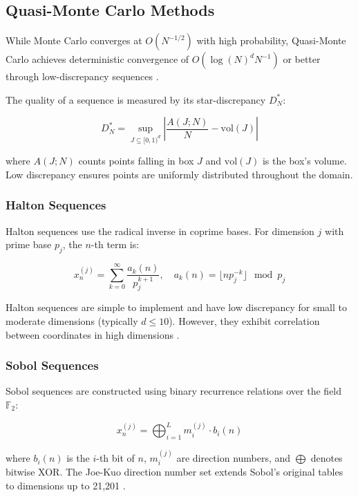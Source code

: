 \documentclass[11pt,a4paper]{article}
\begin{document}
\subsection{Quasi-Monte Carlo Methods}

While Monte Carlo converges at $O(N^{-1/2})$ with high probability, Quasi-Monte Carlo achieves deterministic convergence of $O(\log(N)^d N^{-1})$ or better through low-discrepancy sequences \cite{niederreiter1992random}.

The quality of a sequence is measured by its star-discrepancy $D_N^*$:

\begin{equation}
D_N^* = \sup_{J \subseteq [0,1)^d} \left| \frac{A(J;N)}{N} - \text{vol}(J) \right|
\end{equation}

where $A(J;N)$ counts points falling in box $J$ and $\text{vol}(J)$ is the box's volume. Low discrepancy ensures points are uniformly distributed throughout the domain.

\subsubsection{Halton Sequences}

Halton sequences use the radical inverse in coprime bases. For dimension $j$ with prime base $p_j$, the $n$-th term is:

\begin{equation}
x_n^{(j)} = \sum_{k=0}^{\infty} \frac{a_k(n)}{p_j^{k+1}}, \quad a_k(n) = \lfloor n p_j^{-k} \rfloor \mod p_j
\end{equation}

Halton sequences are simple to implement and have low discrepancy for small to moderate dimensions (typically $d \le 10$). However, they exhibit correlation between coordinates in high dimensions \cite{warnock1972quantum}.

\subsubsection{Sobol Sequences}

Sobol sequences are constructed using binary recurrence relations over the field $\mathbb{F}_2$:

\begin{equation}
x_n^{(j)} = \bigoplus_{i=1}^{L} m_{i}^{(j)} \cdot b_i(n)
\end{equation}

where $b_i(n)$ is the $i$-th bit of $n$, $m_i^{(j)}$ are direction numbers, and $\bigoplus$ denotes bitwise XOR. The Joe-Kuo direction number set extends Sobol's original tables to dimensions up to 21,201 \cite{joe2008structures}.
\end{document}
